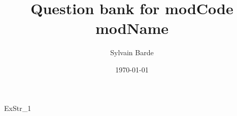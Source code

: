 \documentclass[a4paper, leqno, 12pt]{report}
\title{\bf Question bank for modCode modName}
\author{Sylvain Barde}
\date{\today}
\begin{document}
\maketitle                              %
\tableofcontents                        %

\singlespacing

ExStr_1

\end{document}
